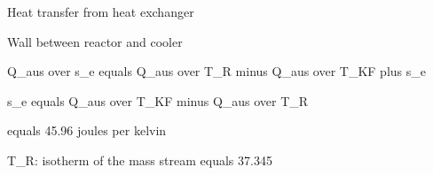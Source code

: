 Heat transfer from heat exchanger

Wall between reactor and cooler

Q_aus over s_e equals Q_aus over T_R minus Q_aus over T_KF plus s_e

s_e equals Q_aus over T_KF minus Q_aus over T_R

equals 45.96 joules per kelvin

T_R: isotherm of the mass stream equals 37.345